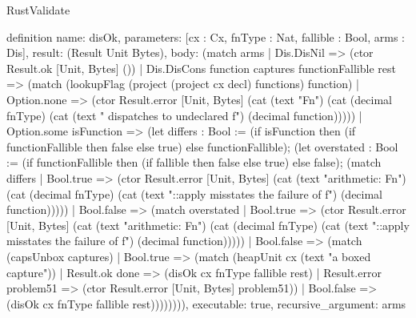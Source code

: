 \begin{lexlean}{RustValidate}
\begin{semanticmodule}
definition{
  name: disOk,
  parameters: [cx : Cx, fnType : Nat, fallible : Bool, arms : Dis],
  result: (Result Unit Bytes),
  body: (match arms
    | Dis.DisNil => (ctor Result.ok [Unit, Bytes] ())
    | Dis.DisCons function captures functionFallible rest => (match (lookupFlag (project (project cx decl) functions) function)
      | Option.none => (ctor Result.error [Unit, Bytes] (cat (text "Fn") (cat (decimal fnType) (cat (text " dispatches to undeclared f") (decimal function)))))
      | Option.some isFunction => (let differs : Bool := (if isFunction then (if functionFallible then false else true) else functionFallible); (let overstated : Bool := (if functionFallible then (if fallible then false else true) else false); (match differs
        | Bool.true => (ctor Result.error [Unit, Bytes] (cat (text "arithmetic: Fn") (cat (decimal fnType) (cat (text "::apply misstates the failure of f") (decimal function)))))
        | Bool.false => (match overstated
          | Bool.true => (ctor Result.error [Unit, Bytes] (cat (text "arithmetic: Fn") (cat (decimal fnType) (cat (text "::apply misstates the failure of f") (decimal function)))))
          | Bool.false => (match (capsUnbox captures)
            | Bool.true => (match (heapUnit cx (text "a boxed capture"))
              | Result.ok done => (disOk cx fnType fallible rest)
              | Result.error problem51 => (ctor Result.error [Unit, Bytes] problem51))
            | Bool.false => (disOk cx fnType fallible rest)))))))),
  executable: true,
  recursive_argument: arms
}


\end{semanticmodule}
\end{lexlean}
